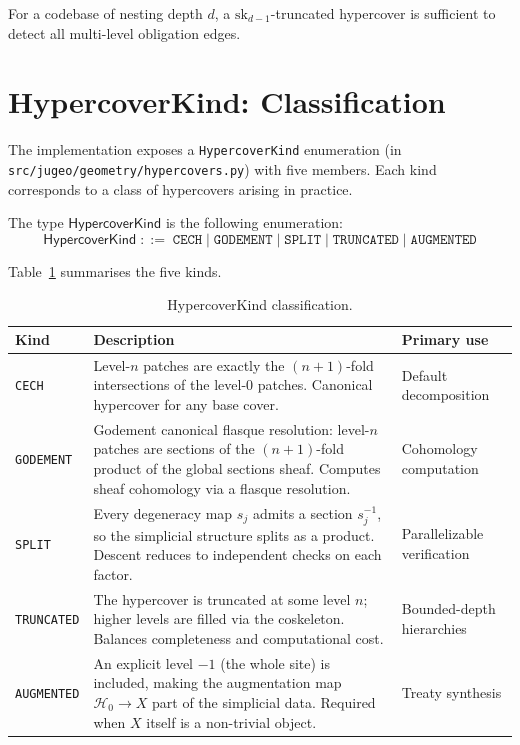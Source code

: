 \documentclass[11pt]{article}
\newcommand{\HC}{\mathcal{H}}              %
\newcommand{\HCK}{\mathsf{HypercoverKind}} %
\newcommand{\sk}{\mathrm{sk}}              %
\newcommand{\degen}[1]{s_{#1}}            %
\newcommand{\KindCech}{\texttt{CECH}}
\newcommand{\KindGod}{\texttt{GODEMENT}}
\newcommand{\KindSplit}{\texttt{SPLIT}}
\newcommand{\KindTrunc}{\texttt{TRUNCATED}}
\newcommand{\KindAug}{\texttt{AUGMENTED}}
\begin{document}
For a codebase of nesting depth $d$, a $\sk_{d-1}$-truncated
hypercover is sufficient to detect all multi-level obligation edges.

\section{HypercoverKind: Classification}\label{sec:kind}

The \JuGeo{} implementation exposes a \texttt{HypercoverKind} enumeration
(in \texttt{src/jugeo/geometry/hypercovers.py}) with five members.
Each kind corresponds to a class of hypercovers arising in practice.

\begin{definition}[HypercoverKind]\label{def:kind}
  The type $\HCK$ is the following enumeration:
  \[
    \HCK \;::=\;
      \KindCech \mid \KindGod \mid \KindSplit \mid \KindTrunc \mid \KindAug
  \]
\end{definition}

Table~\ref{tab:kind} summarises the five kinds.

\begin{table}[H]
\centering
\caption{HypercoverKind classification.}\label{tab:kind}
\begin{tabularx}{\linewidth}{lXl}
\toprule
\textbf{Kind} & \textbf{Description} & \textbf{Primary use} \\
\midrule
\KindCech    & Level-$n$ patches are exactly the $(n{+}1)$-fold
               intersections of the level-0 patches.  Canonical
               hypercover for any base cover. &
               Default decomposition \\[4pt]
\KindGod     & Godement canonical flasque resolution: level-$n$ patches
               are sections of the $(n{+}1)$-fold product of the
               global sections sheaf.  Computes sheaf cohomology
               via a flasque resolution. &
               Cohomology computation \\[4pt]
\KindSplit   & Every degeneracy map $\degen{j}$ admits a section
               $\degen{j}^{-1}$, so the simplicial structure splits
               as a product.  Descent reduces to independent checks
               on each factor. &
               Parallelizable verification \\[4pt]
\KindTrunc   & The hypercover is truncated at some level $n$; higher
               levels are filled via the coskeleton.  Balances
               completeness and computational cost. &
               Bounded-depth hierarchies \\[4pt]
\KindAug     & An explicit level $-1$ (the whole site) is included,
               making the augmentation map $\HC_0 \to X$ part of the
               simplicial data.  Required when $X$ itself is a
               non-trivial object. &
               Treaty synthesis \\
\bottomrule
\end{tabularx}
\end{table}
\end{document}
